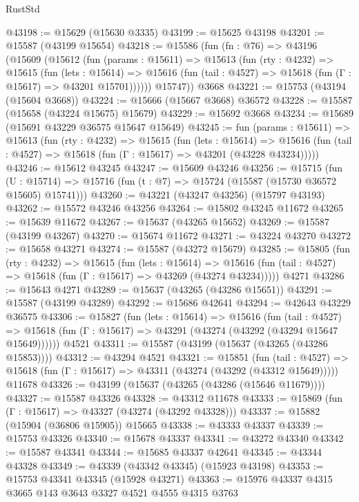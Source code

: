 \begin{lexlean}{RustStd}
\begin{coremodule}
@43198 := @15629 (@15630 @3335)
@43199 := @15625 @43198
@43201 := @15587 (@43199 @15654)
@43218 := @15586
    (fun (fn : @76) =>
    @43196
      (@15609
        (@15612
          (fun (params : @15611) =>
          @15613
            (fun (rty : @4232) =>
            @15615
              (fun (lets : @15614) =>
              @15616 (fun (tail : @4527) => @15618 (fun (Γ : @15617) => @43201 @15701))))))
        @15747))
    @3668
@43221 := @15753 (@43194 (@15604 @3668))
@43224 := @15666 (@15667 @3668) @36572
@43228 := @15587 (@15658 (@43224 @15675) @15679)
@43229 := @15692 @3668
@43234 := @15689 (@15691 @43229 @36575 @15647 @15649)
@43245 := fun (params : @15611) =>
  @15613
    (fun (rty : @4232) =>
    @15615
      (fun (lets : @15614) =>
      @15616 (fun (tail : @4527) => @15618 (fun (Γ : @15617) => @43201 (@43228 @43234)))))
@43246 := @15612 @43245
@43247 := @15609 @43246
@43256 := @15715
    (fun (U : @15714) => @15716 (fun (t : @7) => @15724 (@15587 (@15730 @36572 @15605) @15741)))
@43260 := @43221 (@43247 @43256) (@15797 @43193)
@43262 := @15572 @43246 @43256
@43264 := @15802 @43245 @11672
@43265 := @15639 @11672
@43267 := @15637 (@43265 @15652)
@43269 := @15587 (@43199 @43267)
@43270 := @15674 @11672
@43271 := @43224 @43270
@43272 := @15658 @43271
@43274 := @15587 (@43272 @15679)
@43285 := @15805
    (fun (rty : @4232) =>
    @15615
      (fun (lets : @15614) =>
      @15616 (fun (tail : @4527) => @15618 (fun (Γ : @15617) => @43269 (@43274 @43234)))))
    @4271
@43286 := @15643 @4271
@43289 := @15637 (@43265 (@43286 @15651))
@43291 := @15587 (@43199 @43289)
@43292 := @15686 @42641
@43294 := @42643 @43229 @36575
@43306 := @15827
    (fun (lets : @15614) =>
    @15616
      (fun (tail : @4527) =>
      @15618 (fun (Γ : @15617) => @43291 (@43274 (@43292 (@43294 @15647 @15649))))))
    @4521
@43311 := @15587 (@43199 (@15637 (@43265 (@43286 @15853))))
@43312 := @43294 @4521
@43321 := @15851
    (fun (tail : @4527) => @15618 (fun (Γ : @15617) => @43311 (@43274 (@43292 (@43312 @15649)))))
    @11678
@43326 := @43199 (@15637 (@43265 (@43286 (@15646 @11679))))
@43327 := @15587 @43326
@43328 := @43312 @11678
@43333 := @15869 (fun (Γ : @15617) => @43327 (@43274 (@43292 @43328)))
@43337 := @15882 (@15904 (@36806 @15905)) @15665
@43338 := @43333 @43337
@43339 := @15753 @43326
@43340 := @15678 @43337
@43341 := @43272 @43340
@43342 := @15587 @43341
@43344 := @15685 @43337 @42641
@43345 := @43344 @43328
@43349 := @43339 (@43342 @43345) (@15923 @43198)
@43353 := @15753 @43341 @43345 (@15928 @43271)
@43363 := @15976 @43337 @4315 @3665 @143 @3643 @3327 @4521 @4555 @4315 @3763

\end{coremodule}
\end{lexlean}
